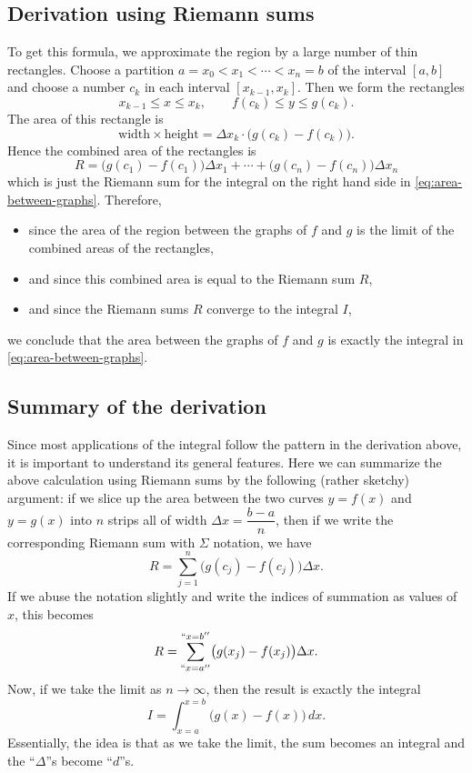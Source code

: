 \subsection{Derivation using Riemann sums} %
To get this formula, we approximate the region by a large number of thin
rectangles.  Choose a partition $a=x_0<x_1<\cdots<x_n=b$ of the interval
$[a,b]$ and choose a number $c_k$ in each interval $[x_{k-1}, x_k]$. Then we form the
rectangles
\[
x_{k-1} \leq x\leq x_k,\qquad f(c_k)\leq y\leq g(c_k).
\]
The area of this rectangle is
\[
\text{width}\times\text{height} = \Delta x_k\cdot\bigl(g(c_k) - f(c_k)\bigr).
\]
Hence the combined area of the rectangles is
\[
R= \bigl(g(c_1) - f(c_1)\bigr)\Delta x_1 + \cdots + \bigl(g(c_n) -
f(c_n)\bigr)\Delta x_n
\]
which is just the Riemann sum for the integral on the right hand side in
\eqref{eq:area-between-graphs}.  Therefore,
\begin{itemize}

\item since the area of the region between the graphs of $f$ and $g$ is the
  limit of the combined areas of the rectangles,

\item and since this combined area is equal to the Riemann sum $R$,

\item and since the Riemann sums $R$ converge to the integral $I$,

\end{itemize}
we conclude that the area between the graphs of $f$ and $g$ is exactly the
integral in \eqref{eq:area-between-graphs}.

\subsection{Summary of the derivation} %
Since most applications of the integral follow the pattern in the derivation
above, it is important to understand its general features.
Here we can summarize the above calculation using Riemann sums by the following
(rather sketchy) argument: if we slice up the area between the two curves
$y=f(x)$ and $y=g(x)$ into $n$ strips all of width $\Delta x = \dfrac{b-a}{n}$,
then if we write the corresponding Riemann sum with $\Sigma$ notation, we have
\[
R= \sum_{j=1}^{n}\bigl(g(c_j) - f(c_j)\bigr)\Delta x.
\]
If we abuse the notation slightly and write the indices of summation as values
of $x$, this becomes
\[
R= \sum_{``x=a''}^{``x=b''}\bigl(g(x_j) - f(x_j)\bigr)\Delta x.
\]
Now, if we take the limit as $n \to \infty$, then the result is exactly the integral
\[
I= \int_{x=a}^{x=b}\bigl(g(x) - f(x)\bigr) \, dx.
\]
Essentially, the idea is that as we take the limit, the sum becomes an integral
and the ``$\Delta$''s become ``$d$''s.

